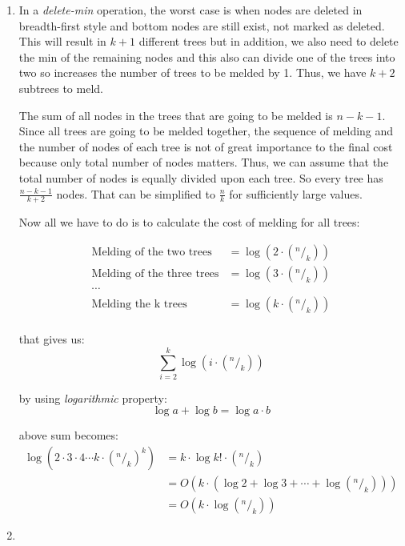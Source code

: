 \begin{enumerate}
  \item 
  In a \textit{delete-min} operation, the worst case is when nodes are deleted in breadth-first style and bottom nodes are still exist, not marked as deleted. This will result in $k+1$ different trees but in addition, we also need to delete the min of the remaining nodes and this also can divide one of the trees into two so increases the number of trees to be melded by 1. Thus, we have $k + 2$ subtrees to meld.

  The sum of all nodes in the trees that are going to be melded is $n-k-1$. Since all trees are going to be melded together, the sequence of melding and the number of nodes of each tree is not of great importance to the final cost because only total number of nodes matters. Thus, we can assume that the total number of nodes is equally divided upon each tree. So every tree has $\frac{n - k - 1}{k + 2}$ nodes. That can be simplified to $\frac{n}{k}$ for sufficiently large values.

  Now all we have to do is to calculate the cost of melding for all trees:
  
  \begin{align*}
    \text{Melding of the two trees}   &= \log(2 \cdot (^n/_k)) \\
    \text{Melding of the three trees} &= \log(3 \cdot (^n/_k)) \\
    \cdots  \\
    \text{Melding the k trees}        &= \log(k \cdot (^n/_k)) \\
  \end{align*}

 that gives us:
 $$
  \sum_{i=2}^{k}{\log(i \cdot (^n/_k))} 
 $$

 by using \textit{logarithmic} property: 
 $$
  \log a + \log b = \log a \cdot b 
 $$
 
 above sum becomes: 
 \begin{align*}
   \log(2 \cdot 3 \cdot 4 \cdots k \cdot (^n/_k)^{k}) &= k \cdot \log {k! \cdot (^n/_k)} \\
   &= O(k \cdot (\log 2 + \log 3 + \cdots + \log (^n/_k))) \\
   &= O(k \cdot \log(^n/_k))
 \end{align*}

 \item

\end{enumerate}